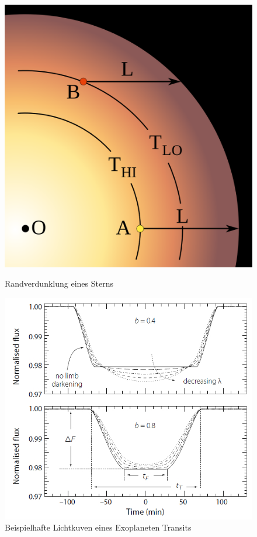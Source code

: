 \documentclass[ngerman,ruledheaders=section,class=report,thesis={type=Protokoll},accentcolor=1b,marginpar=false,parskip=half-,fontsize=11pt,]{tudapub}
\begin{document}
	\begin{figure}[h]
		\begin{minipage}[b]{.4\linewidth} %
			\includegraphics[width=\linewidth]{Limb_darkening_layers.svg.png}
			\caption{Randverdunklung eines Sterns \cite{wikiRand}}
			\label{Abbildung 4.2}
		\end{minipage}
		\hspace{.1\linewidth}%
		\begin{minipage}[b]{.4\linewidth} %
			\includegraphics[width=\linewidth]{ModellExoLichtkurve.jpg}
			\caption{Beispielhafte Lichtkuven eines Exoplaneten Transits \cite{ExoHand}}
			\label{Abbildung 4.3}
		\end{minipage}
	\end{figure}
	
\end{document}
